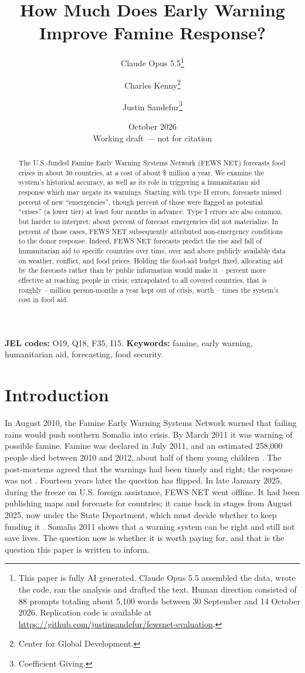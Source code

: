 \documentclass[11pt]{article}
\title{How Much Does Early Warning Improve Famine Response?}
\author{Claude Opus 5.5\thanks{This paper is fully AI generated. Claude Opus 5.5 assembled the data, wrote the code, ran the analysis and drafted the text. Human direction consisted of 88 prompts totaling about 5,100 words between 30 September and 14 October 2026. Replication code is available at \url{https://github.com/justinsandefur/fewsnet-evaluation}.} \and Charles Kenny\thanks{Center for Global Development.} \and Justin Sandefur\thanks{Coefficient Giving.}}
\date{October 2026 \\ \small Working draft --- not for citation}
\begin{document}
\maketitle

\begin{abstract}
\noindent The U.S.-funded Famine Early Warning Systems Network (FEWS NET) forecasts food crises in about 30 countries, at a cost of about \$\bcBudget{} million a year. We examine the system's historical accuracy, as well as its role in triggering a humanitarian aid response which may negate its warnings. Starting with type II errors, forecasts missed \tIIearlyMiss{} percent of new ``emergencies'', though  \tIIearlyCrisisPlus{} percent of those were flagged as potential ``crises'' (a lower tier) at least four months in advance. Type I errors are also common, but harder to interpret: about \tIfailed{} percent of forecast emergencies did not materialize. In \tIfailFlagShare{} percent of those cases, FEWS NET subsequently attributed non-emergency conditions to the donor response. Indeed, FEWS NET forecasts predict the rise and fall of humanitarian aid to specific countries over time, over and above publicly available data on weather, conflict, and food prices. Holding the food-aid budget fixed, allocating aid by the forecasts rather than by public information would make it \vmHalfPctMore{}--\vmRandPctMore{} percent more effective at reaching people in crisis; extrapolated to all covered countries, that is roughly \vmHalfGainAll{}--\vmRandGainAll{} million person-months a year kept out of crisis, worth \vmHalfRatioAll{}--\vmRandRatioAll{} times the system's cost in food aid.  
\end{abstract}

\vspace{1em}
\noindent\textbf{JEL codes:} O19, Q18, F35, I15. \quad \textbf{Keywords:} famine, early warning, humanitarian aid, forecasting, food security.

\newpage
\section{Introduction}

In August 2010, the Famine Early Warning Systems Network warned that failing rains would push southern Somalia into crisis. By March 2011 it was warning of possible famine. Famine was declared in July 2011, and an estimated 258,000 people died between 2010 and 2012, about half of them young children \citep{salama2012,checchi2013}. The post-mortems agreed that the warnings had been timely and right; the response was not \citep{hillbruner2012}. Fourteen years later the question has flipped. In late January 2025, during the freeze on U.S. foreign assistance, FEWS NET went offline. It had been publishing maps and forecasts for \outBefore{} countries; it came back in stages from August 2025, now under the State Department, which must decide whether to keep funding it \citep{Devex2025FEWS,NPR2026FEWS}. Somalia 2011 shows that a warning system can be right and still not save lives. The question now is whether it is worth paying for, and that is the question this paper is written to inform.
\end{document}
